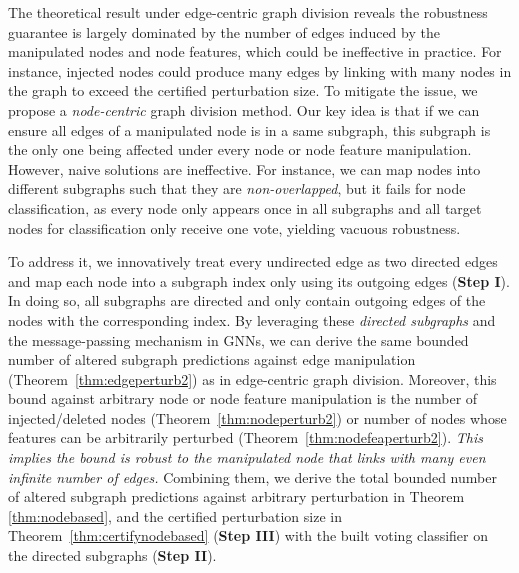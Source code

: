  The theoretical result under edge-centric
graph division reveals the robustness guarantee  
is largely dominated by the number of edges induced by the manipulated nodes and node features, which could be ineffective in practice. For instance, injected nodes could produce many edges by linking with many nodes in the graph to exceed the certified perturbation size. 
To mitigate the issue, we propose a \emph{node-centric} graph division method. 
Our key idea is that if we can ensure all edges of a manipulated node is in a same subgraph, this subgraph is the only one being affected under every node or node feature manipulation. 
However, naive solutions are ineffective. For instance, we can map nodes into different subgraphs such that they are \emph{non-overlapped}, but it fails for node classification, as every node only appears once in all subgraphs and all target nodes for classification only receive one vote, yielding vacuous robustness. 

To address it, we innovatively treat every undirected edge as two directed edges and map each node into a subgraph index only using its outgoing edges ({\bf Step I}). In doing so, all subgraphs are directed and only contain outgoing edges of the nodes with the corresponding index.
By leveraging these \emph{directed subgraphs} and the message-passing mechanism in GNNs, we can derive the same bounded number of altered subgraph predictions against edge manipulation (Theorem~\ref{thm:edgeperturb2}) as in edge-centric graph division. Moreover, this bound 
against arbitrary node or node feature manipulation is the  number of injected/deleted  nodes (Theorem~\ref{thm:nodeperturb2}) or number of nodes whose features can be arbitrarily perturbed (Theorem~\ref{thm:nodefeaperturb2}).  
\emph{This implies the bound is robust to the manipulated node that links with many even infinite number of edges.} 
Combining them, we derive the total bounded number of altered subgraph predictions against arbitrary perturbation in Theorem \ref{thm:nodebased}, 
and the certified perturbation size in Theorem~\ref{thm:certifynodebased} 
({\bf Step III}) with the built voting classifier on the directed subgraphs ({\bf Step II}).   


